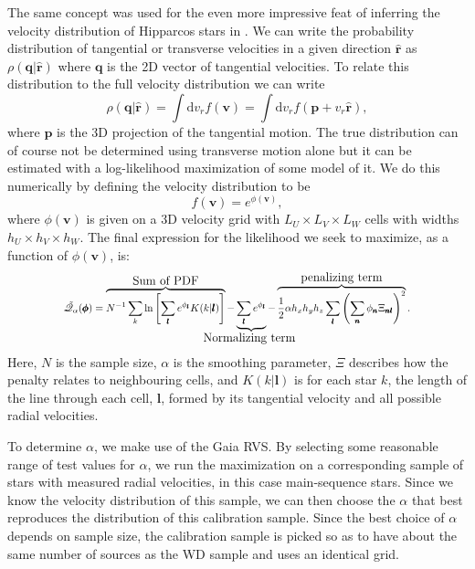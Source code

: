 The same concept was used for the even more impressive feat of inferring the velocity distribution of Hipparcos stars in \cite{dehnen:98a}. We can write the probability distribution of tangential or transverse velocities in a given direction $\hat{\pmb{r}}$ as $\rho(\pmb{q|\hat{\pmb{r}}})$ where $\pmb{q}$ is the 2D vector of tangential velocities. To relate this distribution to the full velocity distribution we can write
\begin{equation}
    \rho(\pmb{q|\hat{\pmb{r}}}) = \int \mathrm{d}v_r f(\pmb{v}) = \int \mathrm{d}v_r f(\pmb{p} + v_r\hat{\pmb{r}}),
\end{equation}
where $\pmb{p}$ is the 3D projection of the tangential motion. The true distribution can of course not be determined using transverse motion alone but it can be estimated with a log-likelihood maximization of some model of it. We do this numerically by defining the velocity distribution to be
\begin{equation}
    f(\pmb{v}) = e^{\phi(\pmb{v})},
\end{equation}
where $\phi(\pmb{v})$ is given on a 3D velocity grid with $L_U\times L_V\times L_W$ cells with widths $h_U\times h_V\times h_W$. The final expression for the likelihood we seek to maximize, as a function of $\phi(\pmb{v})$, is:
\begin{equation}\label{eq:mple}
    \scalemath{0.8}{\tilde{\mathscr{Q}}_\alpha(\pmb{\phi}) = 
    \overbrace{N^{-1}\sum_{k} \ln \left[\sum_{\pmb{l}}e^{\phi_{\pmb{l}}}K(k|\pmb{l})\right]}^\text{\large Sum of PDF} - 
    \underbrace{\sum_{\pmb{l}}e^{\phi_{\pmb{l}}}}_\text{\large \hbox to 0cm{\hss Normalizing term \hss}} - 
    \overbrace{\frac{1}{2}\alpha h_xh_yh_z\sum_{\pmb{l}}\left(\sum_{\pmb{n}} \phi_{\pmb{n}}\Xi_{\pmb{n}\pmb{l}}\right)^2}^\text{\large penalizing term}.
    }
\end{equation}
Here, $N$ is the sample size, $\alpha$ is the smoothing parameter, $\Xi$ describes how the penalty relates to neighbouring cells, and $K(k|\pmb{l})$ is for each star $k$, the length of the line through each cell, $\pmb{l}$, formed by its tangential velocity and all possible radial velocities. 

To determine $\alpha$, we make use of the Gaia RVS. By selecting some reasonable range of test values for $\alpha$, we run the maximization on a corresponding sample of stars with measured radial velocities, in this case main-sequence stars. Since we know the velocity distribution of this sample, we can then choose the $\alpha$ that best reproduces the distribution of this calibration sample. Since the best choice of $\alpha$ depends on sample size, the calibration sample is picked so as to have about the same number of sources as the WD sample and uses an identical grid.


